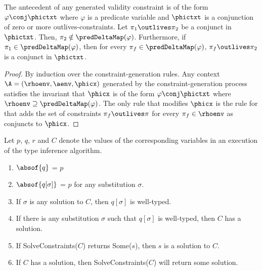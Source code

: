 \begin{lemma}
The antecedent of any generated validity constraint is of the form
$\varphi \conj \phictxt$ where $\varphi$ is a predicate variable and
$\phictxt$ is a conjunction of zero or more outlives-constraints.
Let $\pi_1 \outlives \pi_2$ be a conjunct in $\phictxt$.
Then, $\pi_2 \notin \predDeltaMap(\varphi)$.
Furthermore, if $\pi_1 \in \predDeltaMap(\varphi)$, then for
every $\pi_f \in \predDeltaMap(\varphi)$, $\pi_f \outlives \pi_2$ is
a conjunct in $\phictxt$.
\end{lemma}

\begin{proof}
  By induction over the constraint-generation rules.
  Any context $\A = (\rhoenv,\aenv,\phicx)$ generated by the constraint-generation
  process satisfies the invariant that $\phicx$ is of the form $\varphi \conj \phictxt$
  where $\rhoenv \supseteq \predDeltaMap(\varphi)$.
  The only rule that modifies $\phicx$ is the rule for 
  that adds the set of constraints $\pi_f \outlives \pi$ for every $\pi_f \in \rhoenv$
  as conjuncts to $\phicx$.
\end{proof}


\begin{theorem}
Let $p$, $q$, $r$ and $C$ denote the values of the corresponding
variables in an execution of the type inference algorithm.
\begin{enumerate}
\item $\absof{q}$ = $p$
\item $\absof{q[\sigma]}$ = $p$ for any substitution $\sigma$.
\item If $\sigma$ is any solution to $C$, then $q[\sigma]$ is well-typed.
\item If there is any substitution $\sigma$ such that $q[\sigma]$ is well-typed, then
$C$ has a solution.
\item If SolveConstraints($C$) returns Some($s$), then $s$ is a solution to $C$.
\item If $C$ has a  solution, then SolveConstraints($C$) will return some solution.
\end{enumerate}
\end{theorem}
